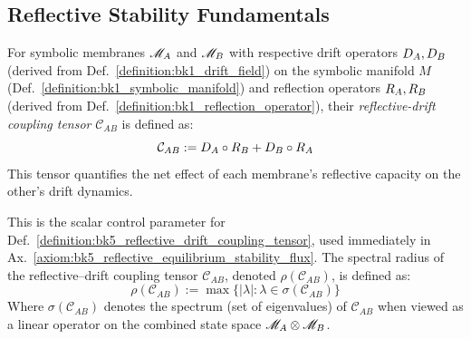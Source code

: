 \subsection{Reflective Stability Fundamentals}
\label{subsec:bk5_reflective_stability_fundamentals}
\begin{definition} \label{definition:bk5_reflective_drift_coupling_tensor}
For symbolic membranes $\mathscr{M}_A$ and $\mathscr{M}_B$ with respective drift operators $D_A, D_B$ (derived from Def.~\ref{definition:bk1_drift_field}) on the symbolic manifold $M$ (Def.~\ref{definition:bk1_symbolic_manifold}) and reflection operators $R_A, R_B$ (derived from Def.~\ref{definition:bk1_reflection_operator}), their \emph{reflective-drift coupling tensor} $\mathcal{C}_{AB}$ is defined as:
\begin{equation}
\mathcal{C}_{AB} := D_A \circ R_B + D_B \circ R_A
\end{equation}
This tensor quantifies the net effect of each membrane's reflective capacity on the other's drift dynamics.
\end{definition}
\begin{definition} \label{definition:bk5_spectral_radius_of_coupl}
This is the scalar control parameter for Def.~\ref{definition:bk5_reflective_drift_coupling_tensor}, used immediately in Ax.~\ref{axiom:bk5_reflective_equilibrium_stability_flux}.
The spectral radius of the reflective–drift coupling tensor \( \mathcal{C}_{AB} \), denoted \( \rho(\mathcal{C}_{AB}) \), is defined as:
\begin{equation}
\rho(\mathcal{C}_{AB}) := \max\{|\lambda| : \lambda \in \sigma(\mathcal{C}_{AB})\}
\end{equation}
Where $\sigma(\mathcal{C}_{AB})$ denotes the spectrum (set of eigenvalues) of $\mathcal{C}_{AB}$ when viewed as a linear operator on the combined state space $\mathscr{M}_A \otimes \mathscr{M}_B$.
\end{definition}
